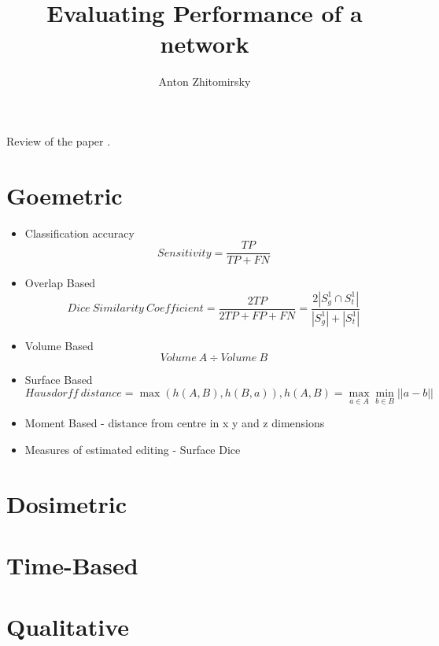 \documentclass[11pt]{article}
\title{Evaluating Performance of a network}
\author{Anton Zhitomirsky}
\begin{document}
\maketitle

Review of the paper \cite{review-metrics}.

\section{Goemetric}

\begin{itemize}
    \item Classification accuracy \begin{equation*}
        Sensitivity = \frac{TP}{TP+FN}
    \end{equation*}
    \item Overlap Based \cite{3d-medical-metric-analysis-2015}
    \begin{equation*}
        Dice\ Similarity\ Coefficient = \frac{2TP}{2TP+FP+FN} = \frac{2|S_g^1 \cap S_t^1|}{|S_g^1| + |S^1_t|}
    \end{equation*}
    \item Volume Based \begin{equation*}
        Volume\ A \div Volume\ B
    \end{equation*}
    \item Surface Based \begin{equation*}
        Hausdorff\ distance = \max(h(A,B), h(B,a)), h(A,B) = \max_{a \in A} \min_{b \in B} || a - b ||
    \end{equation*}
    \item Moment Based - distance from centre in x y and z dimensions
    \item Measures of estimated editing - Surface Dice
\end{itemize}

\section{Dosimetric}



\section{Time-Based}

\section{Qualitative}

\printbibliography
\end{document}
